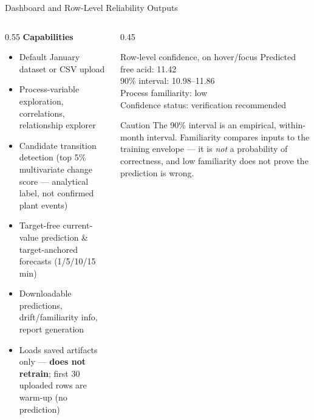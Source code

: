 \documentclass[11pt,aspectratio=169]{beamer}
\begin{document}
\begin{frame}{Dashboard and Row-Level Reliability Outputs}
\begin{columns}[T]
\begin{column}{0.55\textwidth}
\textbf{Capabilities}
\begin{itemize}
    \small
    \item Default January dataset or CSV upload
    \item Process-variable exploration, correlations, relationship explorer
    \item Candidate transition detection (top 5\% multivariate change score — analytical label, not confirmed plant events)
    \item Target-free current-value prediction \& target-anchored forecasts (1/5/10/15 min)
    \item Downloadable predictions, drift/familiarity info, report generation
    \item Loads saved artifacts only — \textbf{does not retrain}; first 30 uploaded rows are warm-up (no prediction)
\end{itemize}
\end{column}
\begin{column}{0.45\textwidth}
\begin{exampleblock}{Row-level confidence, on hover/focus}
\small
Predicted free acid: 11.42 \\
90\% interval: 10.98–11.86 \\
Process familiarity: low \\
Confidence status: verification recommended
\end{exampleblock}
\begin{alertblock}{Caution}
\small The 90\% interval is an empirical, within-month interval. Familiarity compares inputs to the training envelope — it is \emph{not} a probability of correctness, and low familiarity does not prove the prediction is wrong.
\end{alertblock}
\end{column}
\end{columns}
\end{frame}
\end{document}
